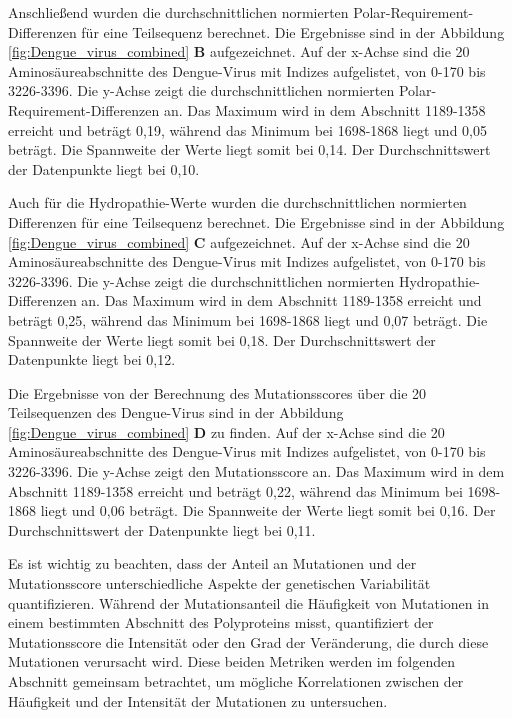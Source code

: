\documentclass[german,version-2022-01]{uzl-thesis}
\begin{document}
Anschlie\ss{}end wurden die durchschnittlichen normierten Polar-Requirement-Differenzen f\"ur eine Teilsequenz berechnet. Die Ergebnisse sind in der Abbildung \ref{fig:Dengue_virus_combined} \textbf{B} aufgezeichnet. Auf der x-Achse sind die 20 Aminos\"aureabschnitte des Dengue-Virus mit Indizes aufgelistet, von 0-170 bis 3226-3396. Die y-Achse zeigt die durchschnittlichen normierten Polar-Requirement-Differenzen an. Das Maximum wird in dem Abschnitt 1189-1358 erreicht und betr\"agt 0,19, w\"ahrend das Minimum bei 1698-1868 liegt und 0,05 betr\"agt. Die Spannweite der Werte liegt somit bei 0,14. Der Durchschnittswert der Datenpunkte liegt bei 0,10. 

Auch f\"ur die Hydropathie-Werte wurden die durchschnittlichen normierten Differenzen f\"ur eine Teilsequenz berechnet. Die Ergebnisse sind in der Abbildung \ref{fig:Dengue_virus_combined} \textbf{C} aufgezeichnet. Auf der x-Achse sind die 20 Aminos\"aureabschnitte des Dengue-Virus mit Indizes aufgelistet, von 0-170 bis 3226-3396. Die y-Achse zeigt die durchschnittlichen normierten Hydropathie-Differenzen an. Das Maximum wird in dem Abschnitt 1189-1358 erreicht und betr\"agt 0,25, w\"ahrend das Minimum bei 1698-1868 liegt und 0,07 betr\"agt. Die Spannweite der Werte liegt somit bei 0,18. Der Durchschnittswert der Datenpunkte liegt bei 0,12.

Die Ergebnisse von der Berechnung des Mutationsscores \"uber die 20 Teilsequenzen des Dengue-Virus sind in der Abbildung \ref{fig:Dengue_virus_combined} \textbf{D} zu finden. Auf der x-Achse sind die 20 Aminos\"aureabschnitte des Dengue-Virus mit Indizes aufgelistet, von 0-170 bis 3226-3396. Die y-Achse zeigt den Mutationsscore an. Das Maximum wird in dem Abschnitt 1189-1358 erreicht und betr\"agt 0,22, w\"ahrend das Minimum bei 1698-1868 liegt und 0,06 betr\"agt. Die Spannweite der Werte liegt somit bei 0,16. Der Durchschnittswert der Datenpunkte liegt bei 0,11. 

Es ist wichtig zu beachten, dass der Anteil an Mutationen und der Mutationsscore unterschiedliche Aspekte der genetischen Variabilit\"at quantifizieren. W\"ahrend der Mutationsanteil die H\"aufigkeit von Mutationen in einem bestimmten Abschnitt des Polyproteins misst, quantifiziert der Mutationsscore die Intensit\"at oder den Grad der Ver\"anderung, die durch diese Mutationen verursacht wird. Diese beiden Metriken werden im folgenden Abschnitt gemeinsam betrachtet, um m\"ogliche Korrelationen zwischen der H\"aufigkeit und der Intensit\"at der Mutationen zu untersuchen.
\end{document}
